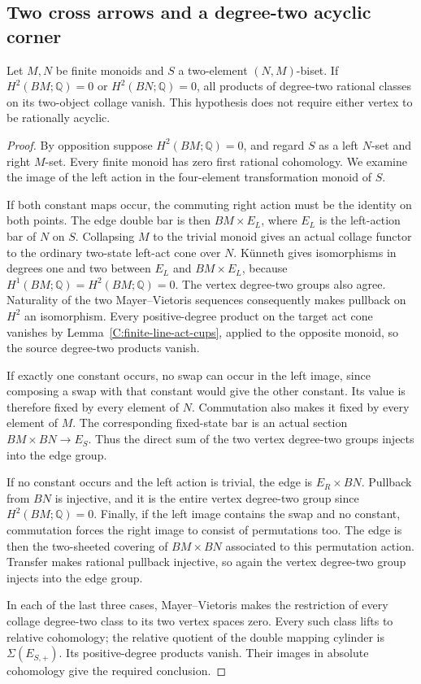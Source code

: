 \subsection{Two cross arrows and a degree-two acyclic corner}

\begin{lemma}\label{C:two-state-biset-H2zero}
Let $M,N$ be finite monoids and $S$ a two-element $(N,M)$-biset.
If $H^2(BM;\mathbb Q)=0$ or $H^2(BN;\mathbb Q)=0$, all products
of degree-two rational classes on its two-object collage vanish.
This hypothesis does not require either vertex to be rationally acyclic.
\end{lemma}
\begin{proof}
By opposition suppose $H^2(BM;\mathbb Q)=0$, and regard $S$ as
a left $N$-set and right $M$-set.  Every finite monoid has zero
first rational cohomology.  We examine the image of the left action
in the four-element transformation monoid of $S$.

If both constant maps occur, the commuting right action must be
the identity on both points.  The edge double bar is then
$BM\times E_L$, where $E_L$ is the left-action bar of $N$ on $S$.
Collapsing $M$ to the trivial monoid gives an actual collage functor
to the ordinary two-state left-act cone over $N$.  K\"unneth gives
isomorphisms in degrees one and two between $E_L$ and
$BM\times E_L$, because $H^1(BM;\mathbb Q)=H^2(BM;\mathbb Q)=0$.
The vertex degree-two groups also agree.  Naturality of the two
Mayer--Vietoris sequences consequently makes pullback on $H^2$ an
isomorphism.  Every positive-degree product on the target act cone
vanishes by Lemma~\ref{C:finite-line-act-cups}, applied to the
opposite monoid, so the source degree-two products vanish.

If exactly one constant occurs, no swap can occur in the left
image, since composing a swap with that constant would give the
other constant.  Its value is therefore fixed by every element
of $N$.  Commutation also makes it fixed by every element of $M$.
The corresponding fixed-state bar is an actual section
$BM\times BN\to E_S$.  Thus the direct sum of the two vertex
degree-two groups injects into the edge group.

If no constant occurs and the left action is trivial, the edge
is $E_R\times BN$.  Pullback from $BN$ is injective, and it is
the entire vertex degree-two group since $H^2(BM;\mathbb Q)=0$.
Finally, if the left image contains the swap and no constant,
commutation forces the right image to consist of permutations
too.  The edge is then the two-sheeted covering of $BM\times BN$
associated to this permutation action.  Transfer makes rational
pullback injective, so again the vertex degree-two group injects
into the edge group.

In each of the last three cases, Mayer--Vietoris makes the
restriction of every collage degree-two class to its two vertex
spaces zero.  Every such class lifts to relative cohomology;
the relative quotient of the double mapping cylinder is
$\Sigma(E_{S,+})$.  Its positive-degree products vanish.
Their images in absolute cohomology give the required conclusion.
\end{proof}
